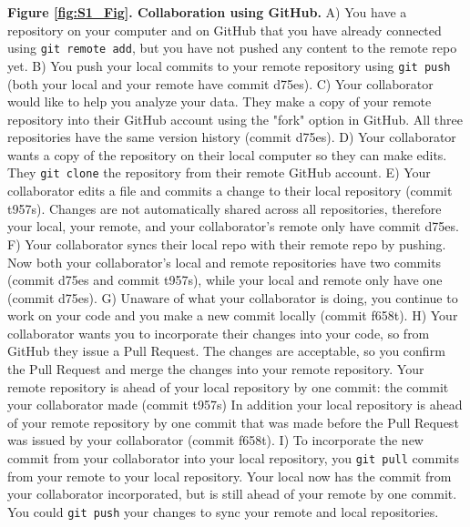 \textbf{Figure \ref{fig:S1_Fig}. Collaboration using GitHub.}
A) You have a repository on your computer and on GitHub that you have already connected using \verb|git remote add|, but you have not pushed any content to the remote repo yet.
B) You push your local commits to your remote repository using \verb|git push| (both your local and your remote have commit d75es).
C) Your collaborator would like to help you analyze your data.
They make a copy of your remote repository into their GitHub account using the "fork" option in GitHub.
All three repositories have the same version history (commit d75es).
D) Your collaborator wants a copy of the repository on their local computer so they can make edits.
They \verb|git clone| the repository from their remote GitHub account.
E) Your collaborator edits a file and commits a change to their local repository (commit t957s).
Changes are not automatically shared across all repositories, therefore your local, your remote, and your collaborator's remote only have commit d75es.
F) Your collaborator syncs their local repo with their remote repo by pushing.
Now both your collaborator's local and remote repositories have two commits (commit d75es and commit t957s), while your local and remote only have one (commit d75es).
G) Unaware of what your collaborator is doing, you continue to work on your code and you make a new commit locally (commit f658t).
H) Your collaborator wants you to incorporate their changes into your code, so from GitHub they issue a Pull Request.
The changes are acceptable, so you confirm the Pull Request and merge the changes into your remote repository.
Your remote repository is ahead of your local repository by one commit: the commit your collaborator made (commit t957s)
In addition your local repository is ahead of your remote repository by one commit that was made before the Pull Request was issued by your collaborator (commit f658t).
I) To incorporate the new commit from your collaborator into your local repository, you \verb|git pull| commits from your remote to your local repository.
Your local now has the commit from your collaborator incorporated, but is still ahead of your remote by one commit.
You could \verb|git push| your changes to sync your remote and local repositories.
